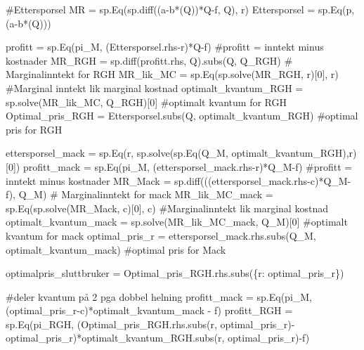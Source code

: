 \documentclass[
  12pt,
  a4paper,
  DIV=11,
  numbers=noendperiod]{scrartcl}
\newenvironment{Shaded}{\begin{snugshade}}{\end{snugshade}}
\newcommand{\CommentTok}[1]{\textcolor[rgb]{0.37,0.37,0.37}{#1}}
\newcommand{\DecValTok}[1]{\textcolor[rgb]{0.68,0.00,0.00}{#1}}
\newcommand{\NormalTok}[1]{\textcolor[rgb]{0.00,0.23,0.31}{#1}}
\newcommand{\OperatorTok}[1]{\textcolor[rgb]{0.37,0.37,0.37}{#1}}
\begin{document}
\begin{Shaded}
\begin{Highlighting}[]
\CommentTok{\#Ettersporsel MR = sp.Eq(sp.diff((a{-}b*(Q))*Q{-}f, Q), r)}
\NormalTok{Ettersporsel }\OperatorTok{=}\NormalTok{ sp.Eq(p, (a}\OperatorTok{{-}}\NormalTok{b}\OperatorTok{*}\NormalTok{(Q)))}

\NormalTok{profitt }\OperatorTok{=}\NormalTok{ sp.Eq(pi\_M, (Ettersporsel.rhs}\OperatorTok{{-}}\NormalTok{r)}\OperatorTok{*}\NormalTok{Q}\OperatorTok{{-}}\NormalTok{f) }\CommentTok{\#profitt = inntekt minus kostnader}
\NormalTok{MR\_RGH }\OperatorTok{=}\NormalTok{ sp.diff(profitt.rhs, Q).subs(Q, Q\_RGH) }\CommentTok{\# Marginalinntekt for RGH}
\NormalTok{MR\_lik\_MC }\OperatorTok{=}\NormalTok{ sp.Eq(sp.solve(MR\_RGH, r)[}\DecValTok{0}\NormalTok{], r) }\CommentTok{\#Marginal inntekt lik marginal kostnad}
\NormalTok{optimalt\_kvantum\_RGH }\OperatorTok{=}\NormalTok{ sp.solve(MR\_lik\_MC, Q\_RGH)[}\DecValTok{0}\NormalTok{] }\CommentTok{\#optimalt kvantum for RGH}
\NormalTok{Optimal\_pris\_RGH }\OperatorTok{=}\NormalTok{ Ettersporsel.subs(Q, optimalt\_kvantum\_RGH) }\CommentTok{\#optimal pris for RGH}



\NormalTok{ettersporsel\_mack }\OperatorTok{=}\NormalTok{ sp.Eq(r, sp.solve(sp.Eq(Q\_M, optimalt\_kvantum\_RGH),r)[}\DecValTok{0}\NormalTok{])}
\NormalTok{profitt\_mack }\OperatorTok{=}\NormalTok{ sp.Eq(pi\_M, (ettersporsel\_mack.rhs}\OperatorTok{{-}}\NormalTok{r)}\OperatorTok{*}\NormalTok{Q\_M}\OperatorTok{{-}}\NormalTok{f) }\CommentTok{\#profitt = inntekt minus kostnader}
\NormalTok{MR\_Mack }\OperatorTok{=}\NormalTok{ sp.diff(((ettersporsel\_mack.rhs}\OperatorTok{{-}}\NormalTok{c)}\OperatorTok{*}\NormalTok{Q\_M}\OperatorTok{{-}}\NormalTok{f), Q\_M)  }\CommentTok{\# Marginalinntekt for mack}
\NormalTok{MR\_lik\_MC\_mack }\OperatorTok{=}\NormalTok{ sp.Eq(sp.solve(MR\_Mack, c)[}\DecValTok{0}\NormalTok{], c) }\CommentTok{\#Marginalinntekt lik marginal kostnad}
\NormalTok{optimalt\_kvantum\_mack }\OperatorTok{=}\NormalTok{ sp.solve(MR\_lik\_MC\_mack, Q\_M)[}\DecValTok{0}\NormalTok{] }\CommentTok{\#optimalt kvantum for mack}
\NormalTok{optimal\_pris\_r }\OperatorTok{=}\NormalTok{ ettersporsel\_mack.rhs.subs(Q\_M, optimalt\_kvantum\_mack) }\CommentTok{\#optimal pris for Mack}



\NormalTok{optimalpris\_sluttbruker }\OperatorTok{=}\NormalTok{ Optimal\_pris\_RGH.rhs.subs(\{r: optimal\_pris\_r\})}


\CommentTok{\#deler kvantum på 2 pga dobbel helning}
\NormalTok{profitt\_mack }\OperatorTok{=}\NormalTok{ sp.Eq(pi\_M, (optimal\_pris\_r}\OperatorTok{{-}}\NormalTok{c)}\OperatorTok{*}\NormalTok{optimalt\_kvantum\_mack }\OperatorTok{{-}}\NormalTok{ f)}
\NormalTok{profitt\_RGH }\OperatorTok{=}\NormalTok{ sp.Eq(pi\_RGH, (Optimal\_pris\_RGH.rhs.subs(r, optimal\_pris\_r)}\OperatorTok{{-}}\NormalTok{optimal\_pris\_r)}\OperatorTok{*}\NormalTok{optimalt\_kvantum\_RGH.subs(r, optimal\_pris\_r)}\OperatorTok{{-}}\NormalTok{f)}


\end{Highlighting}
\end{Shaded}
\end{document}
